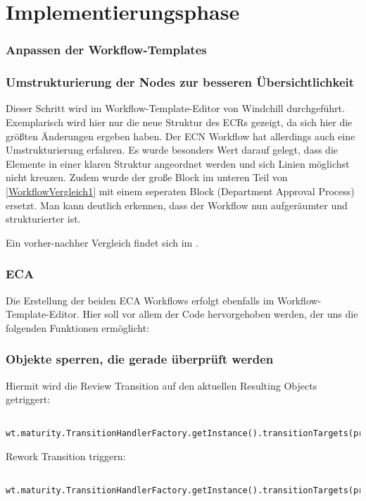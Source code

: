 \section{Implementierungsphase}
\label{sec:Implementierungsphase}

\subsubsection{Anpassen der Workflow-Templates}
\subsubsection*{Umstrukturierung der Nodes zur besseren Übersichtlichkeit}
Dieser Schritt wird im Workflow-Template-Editor von Windchill durchgeführt.
Exemplarisch wird hier nur die neue Struktur des ECRs gezeigt, da sich hier die größten Änderungen ergeben haben.
Der ECN Workflow hat allerdings auch eine Umstrukturierung erfahren.
Es wurde besonders Wert darauf gelegt, dass die Elemente in einer klaren Struktur angeordnet werden und sich Linien möglichst nicht kreuzen.
Zudem wurde der große Block im unteren Teil von \autoref{WorkflowVergleich1} mit einem seperaten Block (Department Approval Process) ersetzt.
Man kann deutlich erkennen, dass der Workflow nun aufgeräumter und strukturierter ist.

Ein vorher-nachher Vergleich findet sich im .

\subsubsection{ECA}
Die Erstellung der beiden ECA Workflows erfolgt ebenfalls im Workflow-Template-Editor.
Hier soll vor allem der Code hervorgehoben werden, der uns die folgenden Funktionen ermöglicht:

\subsubsection*{Objekte sperren, die gerade überprüft werden}
Hiermit wird die Review Transition auf den aktuellen Resulting Objects getriggert:
\begin{lstlisting}
    wt.maturity.TransitionHandlerFactory.getInstance().transitionTargets(primaryBusinessObject,wt.lifecycle.Transition.toTransition("REVIEW"),false);
\end{lstlisting}

Rework Transition triggern:
\begin{lstlisting}
    wt.maturity.TransitionHandlerFactory.getInstance().transitionTargets(primaryBusinessObject,wt.lifecycle.Transition.toTransition("REWORK"),false);
\end{lstlisting}

